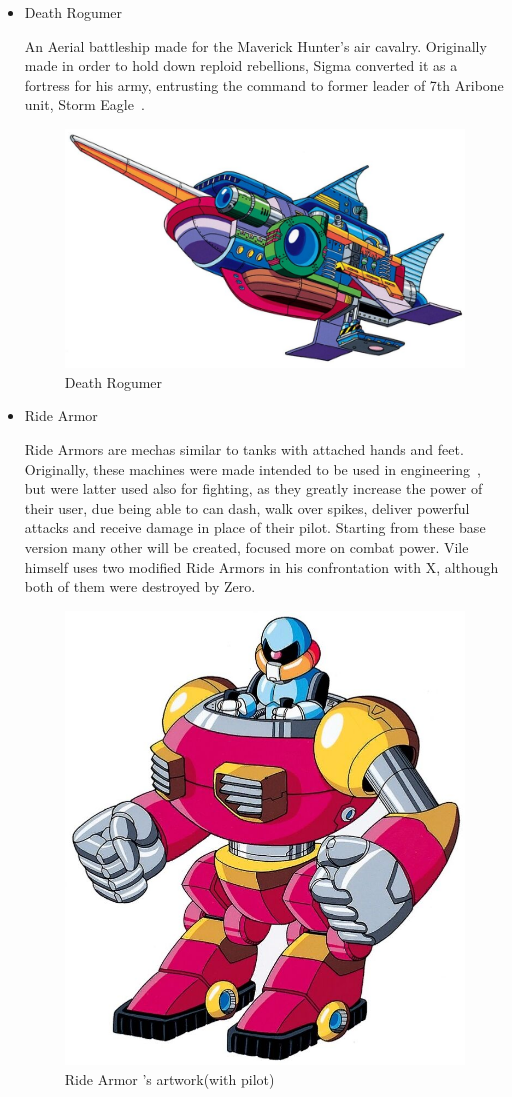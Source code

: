 \begin{itemize}
	\item \hypertarget{veichle:Death_Rogumer}{Death Rogumer}
	An Aerial battleship made for the Maverick Hunter's air cavalry. Originally made in order to hold down reploid rebellions, Sigma converted it as a fortress 
	for his army, entrusting the command to former leader of 7th Aribone unit, Storm Eagle~\cite{wayback:X_resources}.
	\begin{figure}[htp]
		\centering
		\includegraphics[width=\linewidth]{figures/X1/Storm_eagle/DeathRogumer.jpg}
		\caption{Death Rogumer}
	\end{figure}
	\item \hypertarget{veichle:Ride_Armor}{Ride Armor}
	Ride Armors are mechas similar to tanks with attached hands and feet. Originally, these machines were made intended to be used in engineering~\cite{wayback:X_resources}, but were latter used also for fighting, as they greatly increase the power of their user, due being able to can dash, walk over spikes, deliver powerful attacks and receive damage in place of 
	their pilot. Starting from these base version many other will be created, focused more on combat power. Vile himself uses two modified Ride Armors in his confrontation with X, although both of them were destroyed by Zero.
	\begin{figure}[htp]
		\centering
		\includegraphics[width=0.5\linewidth]{figures/X1/Enemies/ArmorSoldier.jpg}
		\caption{Ride Armor 's artwork(with pilot)}
	\end{figure}
	
\end{itemize}